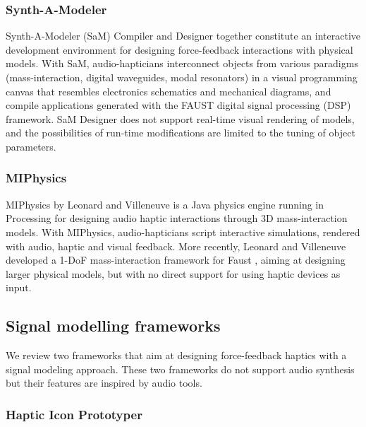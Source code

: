 \documentclass[sigconf]{nimeart}
\begin{document}
\subsubsection{Synth-A-Modeler}\label{synth-a-modeler}

Synth-A-Modeler (SaM) Compiler \cite{Berdahl2012introduction} and Designer \cite{Berdahl2016Automatic} together constitute an interactive development environment for designing force-feedback interactions with physical models. With SaM, audio-hapticians interconnect objects from various paradigms (mass-interaction, digital waveguides, modal resonators) in a visual programming canvas that resembles electronics schematics and mechanical diagrams, and compile applications generated with the FAUST digital signal processing (DSP) framework. SaM Designer does not support real-time visual rendering of models, and the possibilities of run-time modifications are limited to the tuning of object parameters.

\subsubsection{MIPhysics}\label{miphysics}

MIPhysics by Leonard and Villeneuve \cite{Leonard2019Fast} is a Java physics engine running in Processing \cite{Processing} for designing audio haptic interactions through 3D mass-interaction models. With MIPhysics, audio-hapticians script interactive simulations, rendered with audio, haptic and visual feedback. More recently, Leonard and Villeneuve developed a 1-DoF mass-interaction framework for Faust \cite{Leonard2019Formalizing}, aiming at designing larger physical models, but with no direct support for using haptic devices as input.

\subsection{Signal modelling frameworks}\label{signal-modelling-frameworks}

We review two frameworks that aim at designing force-feedback haptics with a signal modeling approach. These two frameworks do not support audio synthesis but their features are inspired by audio tools.

\subsubsection{Haptic Icon Prototyper}\label{haptic-icon-prototyper}
\end{document}
